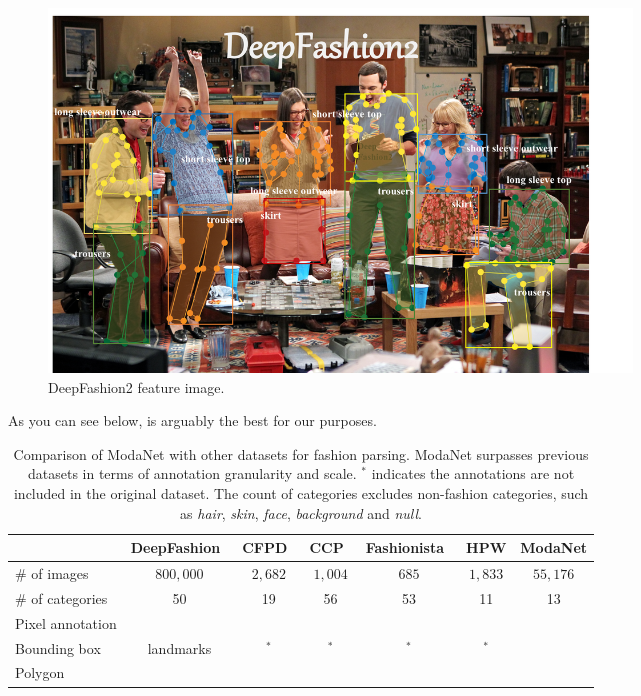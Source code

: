 \begin{figure}[H]
	\centering
	\includegraphics[width=0.75\textwidth]{images/deepfashion2_bigbang}
	\caption{DeepFashion2 feature image.}
	\label{f:deepfashion2_bigbang}
\end{figure}
As you can see below, \modanet is arguably the best for our purposes.
\begin{table}[H]
	\centering
	\caption{Comparison of ModaNet with other datasets for fashion parsing. ModaNet surpasses previous datasets in terms of annotation granularity and scale. \checkmark$^*$  indicates the annotations are not included in the original dataset. The count of categories excludes non-fashion categories, such as \emph{hair}, \emph{skin}, \emph{face}, \emph{background} and \emph{null}.}
	\label{tab:datasets}
	\begin{tabular}{@{}lcccccc@{}}
		\hline
		& DeepFashion~\cite{liu2016deepfashion} & CFPD~\cite{liu2013fashion}    & CCP~\cite{yang2014clothing}     & Fashionista~\cite{yamaguchi2012parsing} & HPW\cite{liang2015deep} & ModaNet  \\
		\hline
		\# of images      & $800,000$   & $2,682$ & $1,004$ & $685$       & $1,833$ & $55,176$ \\
		\# of categories  &     50        &     19    &      56   &       53      &  11  & 13  \\
		Pixel annotation & \texttimes      & \checkmark    &\checkmark & \checkmark      &\checkmark & \checkmark      \\
		Bounding box      & landmarks   &  \checkmark$^*$       & \checkmark$^*$         &     \checkmark$^*$         & \checkmark$^*$  & \checkmark      \\
		Polygon           & \texttimes        & \texttimes     & \texttimes     & \texttimes        &\texttimes  & \checkmark      \\ 
		\hline
	\end{tabular}
\end{table}

